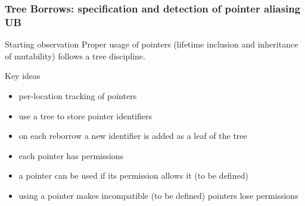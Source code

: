 \begin{frame}[t]
    \frametitle{Tree Borrows: specification and detection of pointer aliasing UB}
    \begin{alertblock}{Starting observation}
        Proper usage of pointers (lifetime inclusion and inheritance of mutability) follows a tree discipline.
    \end{alertblock}
    \begin{block}{Key ideas}
        \begin{itemize}
            \item per-location tracking of pointers
            \item use a tree to store pointer identifiers
            \item on each reborrow a new identifier is added as a leaf of the tree
            \item each pointer has permissions
            \item a pointer can be used if its permission allows it (to be defined)
            \item using a pointer makes incompatible (to be defined) pointers lose permissions
        \end{itemize}
    \end{block}
\end{frame}

